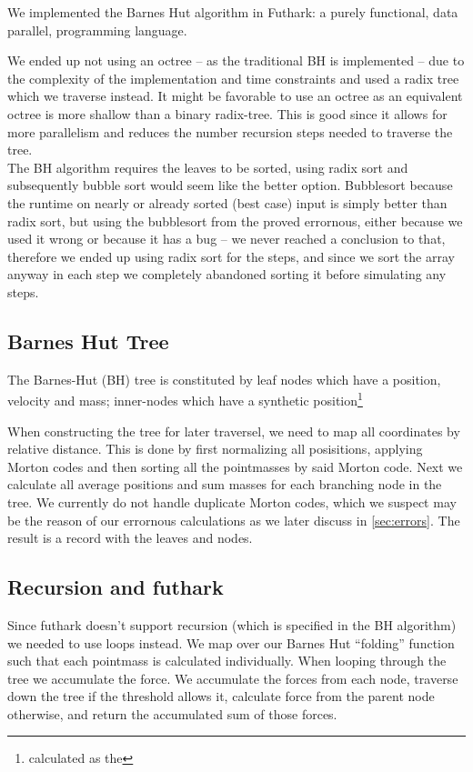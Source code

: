 We implemented the Barnes Hut algorithm in
Futhark\cite{futhark}: a purely functional,
data parallel, programming language.

We ended up not using an octree -- as the traditional BH is implemented -- due
to the complexity of the implementation and time constraints and used a radix
tree which we traverse instead. It might be favorable to use an octree as an
equivalent octree is more shallow than a binary radix-tree. This is good since
it allows for more parallelism and reduces the number recursion steps needed to
traverse the tree.\\

\noindent
The BH algorithm requires the leaves to be sorted, using radix sort and
subsequently bubble sort would seem like the better option. Bubblesort because
the runtime on nearly or already sorted (best case) input is simply better than
radix sort, but using the bubblesort from the
proved errornous, either because we used it wrong or because it has a bug -- we
never reached a conclusion to that, therefore we ended up using radix sort for
the steps, and since we sort the array anyway in each step we completely
abandoned sorting it before simulating any steps.

\subsection{Barnes Hut Tree}
The Barnes-Hut (BH) tree is constituted by leaf nodes which have a position,
velocity and mass; inner-nodes which have a synthetic
position\footnote{calculated as the}


When constructing the tree for later traversel, we need to map all coordinates
by relative distance. This is done by first normalizing all posisitions,
applying Morton codes and then sorting all the pointmasses by said Morton code.
Next we calculate all average positions and sum masses for each branching node
in the tree. We currently do not handle duplicate Morton codes, which we suspect
may be the reason of our errornous calculations as we later discuss in
\autoref{sec:errors}. The result is a record with the leaves and nodes.

\subsection{Recursion and futhark}
Since futhark doesn't support recursion (which is specified in the BH algorithm)
we needed to use loops instead. We map over our Barnes Hut ``folding'' function
such that each pointmass is calculated individually. When looping through the
tree we accumulate the force. We accumulate the forces from each node, traverse
down the tree if the threshold allows it, calculate force from the parent node
otherwise, and return the accumulated sum of those forces.

